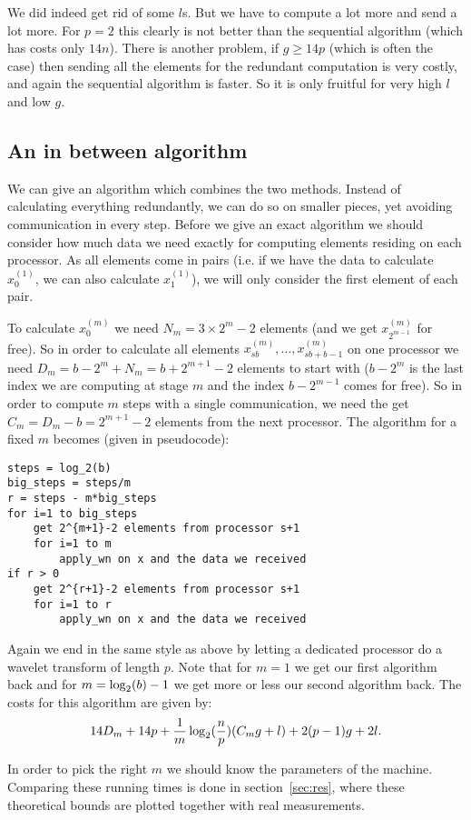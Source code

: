 We did indeed get rid of some $l$s. But we have to compute a lot more and send a lot more. For $p=2$ this clearly is not better than the sequential algorithm (which has costs only $14n$). There is another problem, if $g \geq 14p$ (which is often the case) then sending all the elements for the redundant computation is very costly, and again the sequential algorithm is faster. So it is only fruitful for very high $l$ and low $g$.


\subsection{An in between algorithm}
We can give an algorithm which combines the two methods. Instead of calculating everything redundantly, we can do so on smaller pieces, yet avoiding communication in every step. Before we give an exact algorithm we should consider how much data we need exactly for computing elements residing on each processor. As all elements come in pairs (i.e. if we have the data to calculate $x^{(1)}_0$, we can also calculate $x^{(1)}_1$), we will only consider the first element of each pair.

To calculate $x^{(m)}_0$ we need $N_m = 3 \times 2^m-2$ elements (and we get $x^{(m)}_{2^{m-1}}$ for free). So in order to calculate all elements $x^{(m)}_{sb}, \ldots, x^{(m)}_{sb+b-1}$ on one processor we need $D_m = b - 2^m + N_m = b + 2^{m+1} - 2$ elements to start with ($b-2^m$ is the last index we are computing at stage $m$ and the index $b - 2^{m-1}$ comes for free). So in order to compute $m$ steps with a single communication, we need the get $C_m = D_m - b = 2^{m+1} - 2$ elements from the next processor. The algorithm for a fixed $m$ becomes (given in pseudocode):

\begin{lstlisting}
steps = log_2(b)
big_steps = steps/m
r = steps - m*big_steps
for i=1 to big_steps
	get 2^{m+1}-2 elements from processor s+1
	for i=1 to m
		apply_wn on x and the data we received
if r > 0
	get 2^{r+1}-2 elements from processor s+1
	for i=1 to r
		apply_wn on x and the data we received
\end{lstlisting}

Again we end in the same style as above by letting a dedicated processor do a wavelet transform of length $p$. Note that for $m=1$ we get our first algorithm back and for $m = \operatorname{\log_2}(b)-1$ we get more or less our second algorithm back. The costs for this algorithm are given by:
\[ 14D_m + 14p + \frac{1}{m}\operatorname{\log_2}(\frac{n}{p})(C_mg+l) + 2(p-1)g + 2l. \]

In order to pick the right $m$ we should know the parameters of the machine. Comparing these running times is done in section~\ref{sec:res}, where these theoretical bounds are plotted together with real measurements.
